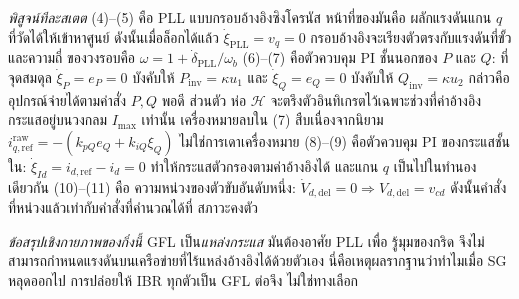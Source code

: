 \documentclass[12pt,a4paper]{article}
\begin{document}
\emph{พิสูจน์ทีละสเตต} (4)--(5) คือ PLL แบบกรอบอ้างอิงซิงโครนัส หน้าที่ของมันคือ
ผลักแรงดันแกน $q$ ที่วัดได้ให้เข้าหาศูนย์ ดังนั้นเมื่อล็อกได้แล้ว
$\dot\xi_{\mathrm{PLL}}=v_q=0$ กรอบอ้างอิงจะเรียงตัวตรงกับแรงดันที่ขั้ว และความถี่
ของวงรอบคือ $\omega=1+\dot\delta_{\mathrm{PLL}}/\omega_b$ (6)--(7) คือตัวควบคุม PI
ชั้นนอกของ $P$ และ $Q$: ที่จุดสมดุล $\dot\xi_P=e_P=0$ บังคับให้
$P_{\mathrm{inv}}=\kappa u_1$ และ $\dot\xi_Q=e_Q=0$ บังคับให้
$Q_{\mathrm{inv}}=\kappa u_2$ กล่าวคืออุปกรณ์จ่ายได้ตามค่าสั่ง $P,Q$ พอดี ส่วนตัว
ห่อ $\mathcal H$ จะตรึงตัวอินทิเกรตไว้เฉพาะช่วงที่ค่าอ้างอิงกระแสอยู่บนวงกลม
$I_{\max}$ เท่านั้น เครื่องหมายลบใน (7) สืบเนื่องจากนิยาม
$i_{q,\mathrm{ref}}^{\mathrm{raw}}=-(k_{pQ}e_Q+k_{iQ}\xi_Q)$ ไม่ใช่การเดาเครื่องหมาย
(8)--(9) คือตัวควบคุม PI ของกระแสชั้นใน: $\dot\xi_{Id}=i_{d,\mathrm{ref}}-i_d=0$
ทำให้กระแสตัวกรองตามค่าอ้างอิงได้ และแกน $q$ เป็นไปในทำนองเดียวกัน (10)--(11) คือ
ความหน่วงของตัวขับอันดับหนึ่ง: $\dot V_{d,\mathrm{del}}=0\Rightarrow
V_{d,\mathrm{del}}=v_{cd}$ ดังนั้นคำสั่งที่หน่วงแล้วเท่ากับคำสั่งที่คำนวณได้ที่
สภาวะคงตัว

\emph{ข้อสรุปเชิงกายภาพของกิ่งนี้} GFL เป็น\emph{แหล่งกระแส} มันต้องอาศัย PLL เพื่อ
รู้มุมของกริด จึงไม่สามารถกำหนดแรงดันบนเครือข่ายที่ไร้แหล่งอ้างอิงได้ด้วยตัวเอง
นี่คือเหตุผลรากฐานว่าทำไมเมื่อ SG หลุดออกไป การปล่อยให้ IBR ทุกตัวเป็น GFL ต่อจึง
ไม่ใช่ทางเลือก
\end{document}
